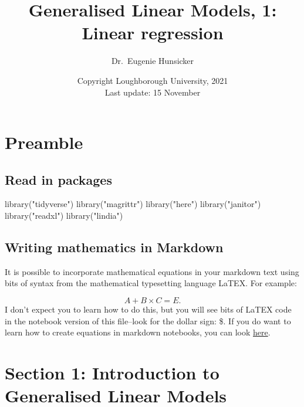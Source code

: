 \documentclass[
]{article}
\title{Generalised Linear Models, 1: Linear regression}
\author{Dr.~Eugenie Hunsicker}
\date{Copyright Loughborough University, 2021\\
Last update: 15 November}
\newenvironment{Shaded}{\begin{snugshade}}{\end{snugshade}}
\newcommand{\FunctionTok}[1]{\textcolor[rgb]{0.00,0.00,0.00}{#1}}
\newcommand{\NormalTok}[1]{#1}
\newcommand{\StringTok}[1]{\textcolor[rgb]{0.31,0.60,0.02}{#1}}
\begin{document}
\maketitle

{
\setcounter{tocdepth}{2}
\tableofcontents
}
\hypertarget{preamble}{%
\section{Preamble}\label{preamble}}

\hypertarget{read-in-packages}{%
\subsection{Read in packages}\label{read-in-packages}}

\begin{Shaded}
\begin{Highlighting}[]
\FunctionTok{library}\NormalTok{(}\StringTok{"tidyverse"}\NormalTok{)}
\FunctionTok{library}\NormalTok{(}\StringTok{"magrittr"}\NormalTok{)}
\FunctionTok{library}\NormalTok{(}\StringTok{"here"}\NormalTok{)}
\FunctionTok{library}\NormalTok{(}\StringTok{"janitor"}\NormalTok{)}
\FunctionTok{library}\NormalTok{(}\StringTok{"readxl"}\NormalTok{)}
\FunctionTok{library}\NormalTok{(}\StringTok{"lindia"}\NormalTok{)}
\end{Highlighting}
\end{Shaded}

\hypertarget{writing-mathematics-in-markdown}{%
\subsection{Writing mathematics in
Markdown}\label{writing-mathematics-in-markdown}}

It is possible to incorporate mathematical equations in your markdown
text using bits of syntax from the mathematical typesetting language
LaTEX. For example:

\[
A + B\times C = E.
\] I don't expect you to learn how to do this, but you will see bits of
LaTEX code in the notebook version of this file--look for the dollar
sign: \$. If you do want to learn how to create equations in markdown
notebooks, you can look
\href{http://www.math.mcgill.ca/yyang/regression/RMarkdown/example.html}{here}.

\hypertarget{section-1-introduction-to-generalised-linear-models}{%
\section{Section 1: Introduction to Generalised Linear
Models}\label{section-1-introduction-to-generalised-linear-models}}
\end{document}
